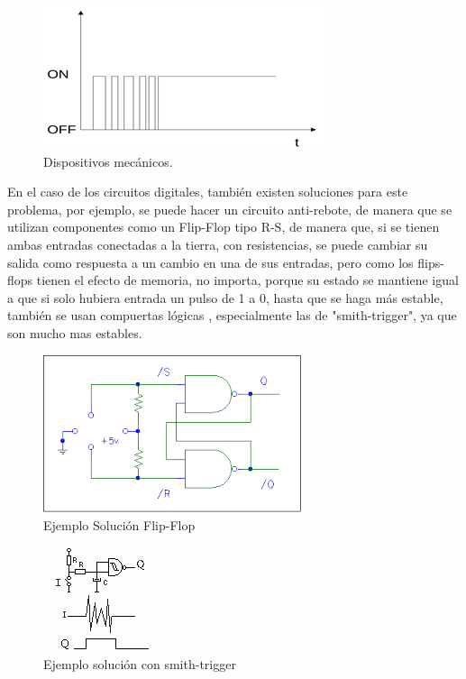 \documentclass[journal,trans]{IEEEtran}
\begin{document}
	\begin{figure}[hbtp]
		\centering
		\includegraphics[scale = 0.5]{imagenes/efectoRebote.png}
		\caption[Figura1]{Dispositivos mecánicos.}
		\label{fig:EfectoRebo}
	\end{figure}


	En el caso de los circuitos digitales, también existen soluciones para este problema, por ejemplo, se puede hacer un circuito anti-rebote, de manera que se utilizan componentes como un Flip-Flop tipo  R-S, de manera que, si se tienen ambas entradas conectadas a la tierra, con resistencias, se puede cambiar su salida como respuesta a un cambio en una de sus entradas, pero como los flips-flops tienen el efecto de memoria, no importa, porque su estado se mantiene igual a que si solo hubiera entrada un pulso de 1 a 0, hasta que se haga m\'as estable, también se usan compuertas l\'ogicas , especialmente las de "smith-trigger", ya que son mucho mas estables.
	
	\begin{figure}[h]
		\centering
		\includegraphics[scale=0.6]{imagenes/flipflopsrebote.png}
		\caption{Ejemplo Solución Flip-Flop}
		\label{fig:tikz-flipflop}
	\end{figure}
	
	\begin{figure}[h]
		\centering
		\includegraphics[scale=0.7]{imagenes/smith.png}
		\caption{Ejemplo solución con smith-trigger}
		\label{fig:tikz-smith}
	\end{figure}
	
\end{document}
